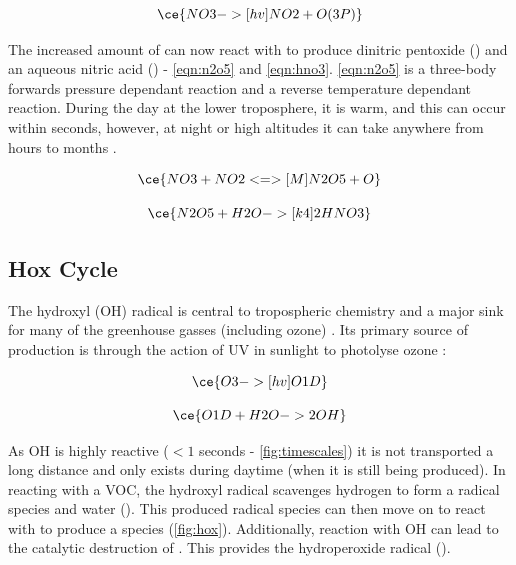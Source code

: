 \begin{equation}
  \ce{NO3 ->[hv] NO2 + O(3P)}
  \label{eqn:nno3}
\end{equation}


 The increased amount of  can now react with  to produce dinitric pentoxide () and an aqueous nitric acid () - \autoref{eqn:n2o5} and \autoref{eqn:hno3}. \autoref{eqn:n2o5} is a three-body forwards pressure dependant reaction and a reverse temperature dependant reaction. During the day at the lower troposphere, it is warm, and this can occur within seconds, however, at night or high altitudes it can take anywhere from hours to months \citep{fundamentals}.


\begin{equation}
  \ce{NO3 + NO2 <=>[M] N2O5 + O}
  \label{eqn:n2o5}
\end{equation}

\begin{equation}
  \ce{N2O5 + H2O ->[k4] 2HNO3}
  \label{eqn:hno3}
\end{equation}



\subsection{Hox Cycle}
The hydroxyl (OH) radical is central to tropospheric chemistry and a major sink for many of the greenhouse gasses (including ozone) \citep{olson}. Its primary source of production is through the action of UV in sunlight to photolyse ozone \citep{fundamentals}:


\begin{equation}
  \ce{O3 ->[hv] O1D}
\end{equation}

\begin{equation}
  \ce{O1D + H2O -> 2OH}
\end{equation}

As OH is highly reactive ($<1$ seconds - \autoref{fig:timescales}) it is not transported a long distance and only exists during daytime (when it is still being produced). In reacting with a VOC, the hydroxyl radical scavenges hydrogen to form a radical species and water (). This produced radical species can then move on to react with  to produce a  species (\autoref{fig:hox}). Additionally, reaction with OH can lead to the catalytic destruction of . This provides the hydroperoxide radical (). 

